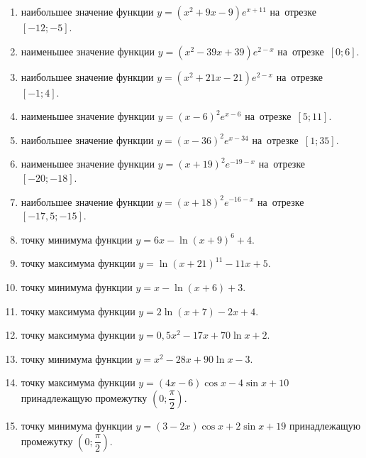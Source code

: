 \documentclass[a4paper,10pt]{article}
\begin{document}
\begin{enumerate}
\item {} наибольшее значение функции $y=\left(x^2 +9x -9\right)e^{x+11}$ на~отрезке~$\left[-12;-5\right]$.

\item {} наименьшее значение функции $y=\left(x^2 -39x +39\right)e^{2-x}$ на~отрезке~$\left[0;6\right]$.

\item {} наибольшее значение функции $y=\left(x^2 +21x -21\right)e^{2-x}$ на~отрезке~$\left[-1;4\right]$.

\item {} наименьшее значение функции $y=\left(x-6\right)^2e^{x-6}$ на~отрезке~$\left[5;11\right]$.

\item {} наибольшее значение функции $y=\left(x-36\right)^2e^{x-34}$ на~отрезке~$\left[1;35\right]$.

\item {} наименьшее значение функции $y=\left(x+19\right)^2e^{-19-x}$ на~отрезке~$\left[-20;-18\right]$.

\item {} наибольшее значение функции $y=\left(x+18\right)^2e^{-16-x}$ на~отрезке~$\left[-17,5;-15\right]$.

\item {} точку минимума функции $y=6x-\ln\left(x+9\right)^{6}+4$.

\item {} точку максимума функции $y=\ln\left(x+21\right)^{11}-11x+5$.

\item {} точку минимума функции $y=x-\ln\left(x+6\right)+3$.

\item {} точку максимума функции $y=2\ln\left(x+7\right)-2x+4$.

\item {} точку максимума функции $y=0,5x^2-17x+70\ln x +2$.

\item {} точку минимума функции $y=x^2-28x+90\ln x -3$.

\item {} точку максимума функции $y=\left(4x-6\right)\cos x -4\sin x+10$
принадлежащую промежутку $\left(0;\dfrac{\pi}{2}\right)$.

\item {} точку минимума функции $y=\left(3-2x\right)\cos x +2\sin x+19$
принадлежащую промежутку $\left(0;\dfrac{\pi}{2}\right)$.


\end{enumerate}
\end{document}
